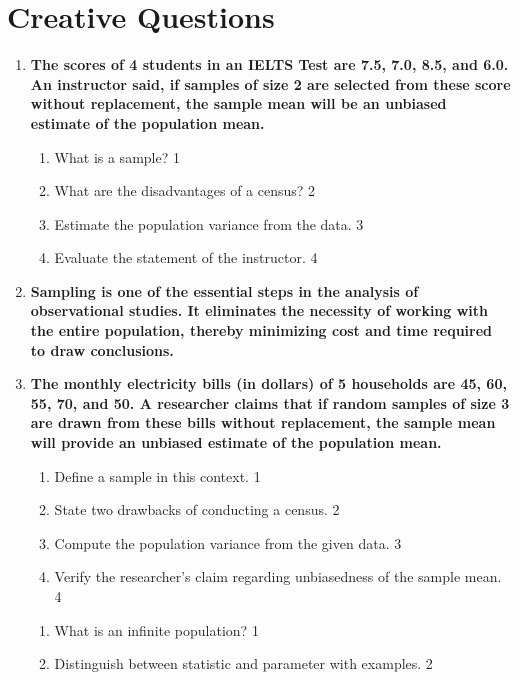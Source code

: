 \documentclass[a4paper,oneside]{book}
\begin{document}
\section{Creative Questions}
  \begin{enumerate}
  
   \item
  \textbf{The scores of 4 students in an IELTS Test are 7.5, 7.0, 8.5, and 6.0. An instructor said, if samples of size 2 are selected from these score without replacement, the sample mean will be an unbiased estimate of the population mean.}

  
  \begin{enumerate}
    \item
	What is a sample? \hfill 1
    \item
	What are the disadvantages of a census? \hfill 2
    \item  
	Estimate the population variance from the data. \hfill 3
    \item
	Evaluate the statement of the instructor. \hfill 4
  \end{enumerate}
  
  
 \item
  \textbf{Sampling is one of the essential steps in the analysis of observational studies. It eliminates the necessity of working with the entire population, thereby minimizing cost and time required to draw conclusions.}

\item
  \textbf{The monthly electricity bills (in dollars) of 5 households are 45, 60, 55, 70, and 50. A researcher claims that if random samples of size 3 are drawn from these bills without replacement, the sample mean will provide an unbiased estimate of the population mean.}

  
  \begin{enumerate}
    \item
    Define a sample in this context. \hfill 1
    \item
    State two drawbacks of conducting a census. \hfill 2
    \item  
    Compute the population variance from the given data. \hfill 3
    \item
    Verify the researcher's claim regarding unbiasedness of the sample mean. \hfill 4
  \end{enumerate}
  
  \begin{enumerate}
    \item
	What is an infinite population? \hfill 1
    \item
	Distinguish between statistic and parameter with examples. \hfill 2


\end{enumerate}
\end{enumerate}
\end{document}
